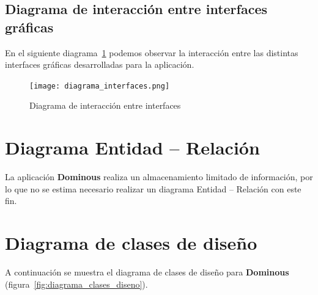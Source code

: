 \subsection{Diagrama de interacción entre interfaces gráficas}

En el siguiente diagrama~\ref{fig:diagramainteraccioninterfaces} podemos observar la interacción entre
las distintas interfaces gráficas desarrolladas para la aplicación. \\

\begin{figure}[h]
  \label{fig:diagramainteraccioninterfaces}
  \begin{center}
    \texttt{[image: diagrama\_interfaces.png]}
  \end{center}
  \caption{Diagrama de interacción entre interfaces}
\end{figure}

\section{Diagrama Entidad -- Relación}

La aplicación \textbf{Dominous} realiza un almacenamiento limitado de información, por lo que no se estima necesario
realizar un diagrama Entidad -- Relación con este fin.

\section{Diagrama de clases de diseño}

A continuación se muestra el diagrama de clases de diseño para \textbf{Dominous} (figura~\vref{fig:diagrama_clases_diseno}).

